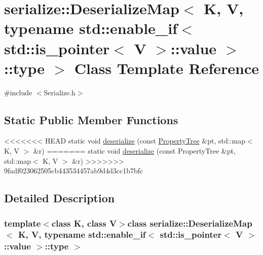 \hypertarget{classserialize_1_1_deserialize_map_3_01_k_00_01_v_00_01typename_01std_1_1enable__if_3_01std_1_1ibe6cfa8a2d341f3a0942baedd95196d5}{}\section{serialize\+:\+:Deserialize\+Map$<$ K, V, typename std\+:\+:enable\+\_\+if$<$ std\+:\+:is\+\_\+pointer$<$ V $>$\+:\+:value $>$\+:\+:type $>$ Class Template Reference}
\label{classserialize_1_1_deserialize_map_3_01_k_00_01_v_00_01typename_01std_1_1enable__if_3_01std_1_1ibe6cfa8a2d341f3a0942baedd95196d5}


{\ttfamily \#include $<$Serialize.\+h$>$}

\subsection*{Static Public Member Functions}
\begin{DoxyCompactItemize}
\item 
<<<<<<< HEAD
static void \hyperlink{classserialize_1_1_deserialize_map_3_01_k_00_01_v_00_01typename_01std_1_1enable__if_3_01std_1_1ibe6cfa8a2d341f3a0942baedd95196d5_ad440b5c02ce0eb7839f46df2e95f93ee}{deserialize} (const \hyperlink{namespacesolar__core_adeda2737d6938c190eb774a5b2495045}{Property\+Tree} \&pt, std\+::map$<$ K, V $>$ \&r)
=======
static void \hyperlink{classserialize_1_1_deserialize_map_3_01_k_00_01_v_00_01typename_01std_1_1enable__if_3_01std_1_1ibe6cfa8a2d341f3a0942baedd95196d5_ad440b5c02ce0eb7839f46df2e95f93ee}{deserialize} (const Property\+Tree \&pt, std\+::map$<$ K, V $>$ \&r)
>>>>>>> 9fadf023062505cb443534457ab9d4d3cc1b7bfc
\end{DoxyCompactItemize}


\subsection{Detailed Description}
\subsubsection*{template$<$class K, class V$>$class serialize\+::\+Deserialize\+Map$<$ K, V, typename std\+::enable\+\_\+if$<$ std\+::is\+\_\+pointer$<$ V $>$\+::value $>$\+::type $>$}



